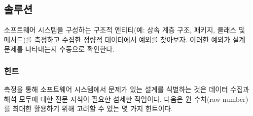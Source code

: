 \documentclass[a4paper,10pt,twoside]{book}
\begin{document}
\subsection*{솔루션}

소프트웨어 시스템을 구성하는 구조적 엔티티(예: 상속 계층 구조, 패키지, 클래스 및 메서드)를 측정하고 수집한 정량적 데이터에서 예외를 찾아보자. 이러한 예외가 설계 문제를 나타내는지 수동으로 확인한다.

\subsubsection*{힌트}

측정을 통해 소프트웨어 시스템에서 문제가 있는 설계를 식별하는 것은 데이터 수집과 해석 모두에 대한 전문 지식이 필요한 섬세한 작업이다. 다음은 원 수치(raw number)를 최대한 활용하기 위해 고려할 수 있는 몇 가지 힌트이다.
\end{document}
